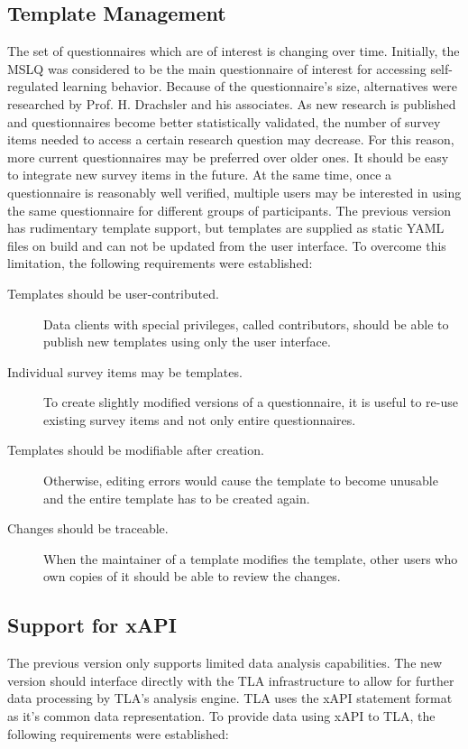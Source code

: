\subsection{Template Management}
The set of questionnaires which are of interest is changing over time.
Initially, the MSLQ was considered to be the main questionnaire of interest
for accessing self-regulated learning behavior. Because of the questionnaire's
size, alternatives were researched by Prof. H. Drachsler and his associates.
As new research is published and questionnaires become better statistically validated, the number of survey
 items needed to access a certain research question may decrease.
 For this reason, more current questionnaires may be preferred over
 older ones. It should be easy to integrate new survey items in the future.
 At the same time, once a questionnaire is reasonably well verified, multiple users
 may be interested in using the same questionnaire for different groups of participants.
 The previous version has rudimentary template support, but templates are supplied as static
 YAML files on build and can not be updated from the user interface.
 To overcome this limitation, the following requirements were established:

 \begin{description}
     \item[Templates should be user-contributed.] Data clients with special
     privileges, called contributors, should be able to publish new templates
     using only the user interface.
     \item[Individual survey items may be templates.] To create slightly modified
     versions of a questionnaire, it is useful to re-use existing survey items and not
     only entire questionnaires.
     \item[Templates should be modifiable after creation.] Otherwise, editing
     errors would cause the template to become unusable and the entire template
     has to be created again.
     \item[Changes should be traceable.] When the maintainer of a template 
     modifies the template, other users who own copies of it should be able to 
     review the changes.
 \end{description}

\subsection{Support for xAPI}
 The previous version only supports limited data analysis capabilities.
 The new version should interface directly with the TLA 
 infrastructure to allow for further data processing by TLA's analysis engine. 
 TLA uses the xAPI statement format as it's common data representation. To provide data
 using xAPI to TLA, the following requirements were established:

